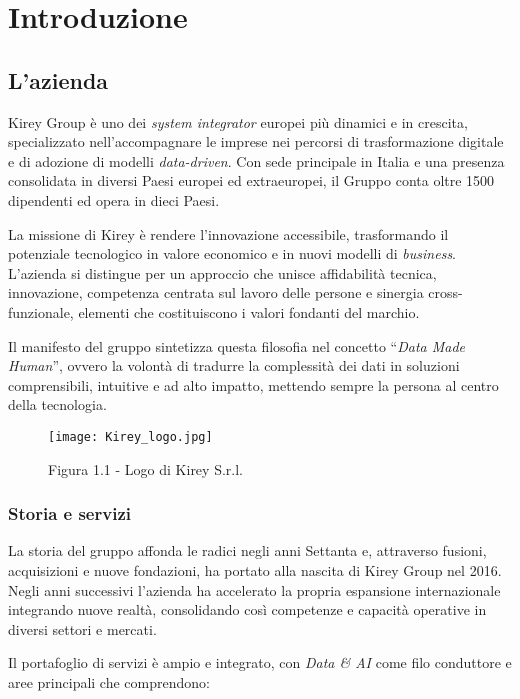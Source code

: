 \chapter{Introduzione}
\label{cap:introduzione}

\section{L'azienda}

Kirey Group è uno dei \emph{system integrator} europei più dinamici e in crescita, specializzato nell'accompagnare le imprese nei percorsi di trasformazione digitale
 e di adozione di modelli \emph{data-driven}. Con sede principale in Italia e una presenza consolidata in diversi Paesi europei ed extraeuropei, 
 il Gruppo conta oltre 1500 dipendenti ed opera in dieci Paesi.

La missione di Kirey è rendere l'innovazione accessibile, trasformando il potenziale tecnologico in valore economico e in nuovi modelli di \emph{business}. 
L'azienda si distingue per un approccio che unisce affidabilità tecnica, innovazione, competenza centrata sul lavoro delle persone e sinergia cross-funzionale, 
elementi che costituiscono i valori fondanti del marchio.

Il manifesto del gruppo sintetizza questa filosofia nel concetto “\emph{Data Made Human}”, ovvero la volontà di tradurre la complessità dei dati in soluzioni comprensibili, 
intuitive e ad alto impatto, mettendo sempre la persona al centro della tecnologia.

\begin{figure}[!h] 
    \centering 
    \texttt{[image: Kirey\_logo.jpg]} 
    \caption{Figura 1.1 - Logo di Kirey S.r.l.}
\end{figure}


\subsection{Storia e servizi}

La storia del gruppo affonda le radici negli anni Settanta e, attraverso fusioni, acquisizioni e nuove fondazioni, ha portato alla nascita di Kirey Group nel 2016. 
Negli anni successivi l'azienda ha accelerato la propria espansione internazionale integrando nuove realtà, consolidando così competenze e capacità operative in diversi settori e mercati.

Il portafoglio di servizi è ampio e integrato, con \emph{Data \& AI} come filo conduttore e aree principali che comprendono:

